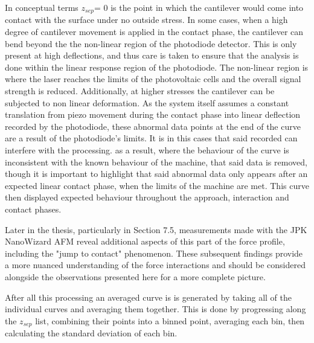 In conceptual terms $z_{sep} \textit{= 0}$ is the point in which the cantilever would come into contact with the surface under no outside stress. In some cases, when a high degree of cantilever movement is applied in the contact phase, the cantilever can bend beyond the the non-linear region of the photodiode detector. This is only present at high deflections, and thus care is taken to ensure that the analysis is done within the linear response region of the photodiode. The non-linear region is where the laser reaches the limits of the photovoltaic cells and the overall signal strength is reduced. Additionally, at higher stresses the cantilever can be subjected to non linear deformation. As the system itself assumes a constant translation from piezo movement during the contact phase into linear deflection recorded by the photodiode, these abnormal data points at the end of the curve are a result of the photodiode's limits. It is in this cases that said recorded can interfere with the processing. as a result, where the behaviour of the curve is inconsistent with the known behaviour of the machine, that said data is removed, though it is important to highlight that said abnormal data only appears after an expected linear contact phase, when the limits of the machine are met. This curve then displayed expected behaviour throughout the approach, interaction and contact phases.

Later in the thesis, particularly in Section 7.5, measurements made with the JPK NanoWizard AFM reveal additional aspects of this part of the force profile, including the "jump to contact" phenomenon. These subsequent findings provide a more nuanced understanding of the force interactions and should be considered alongside the  observations presented here for a more complete picture.

After all this processing an averaged curve is is generated by taking all of the individual curves and averaging them together. This is done by progressing along the $z_{sep}$ list, combining their points into a binned point, averaging each bin, then calculating the standard deviation of each bin.

